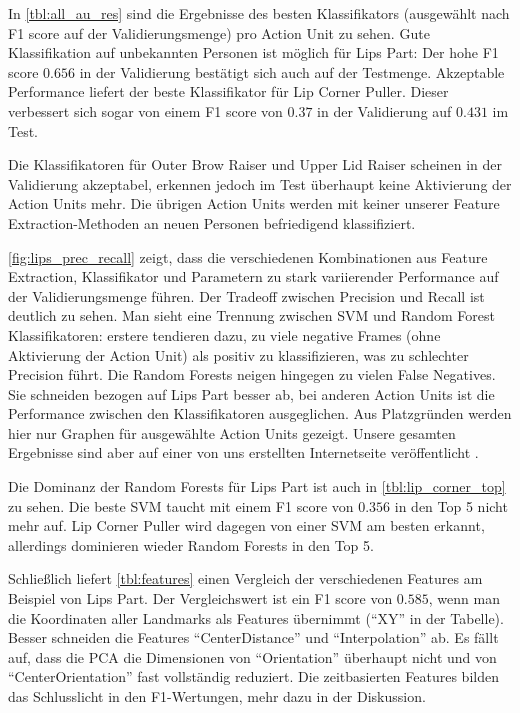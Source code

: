 In \cref{tbl:all_au_res} sind die Ergebnisse des besten Klassifikators
(ausgewählt nach F1 score auf der Validierungsmenge) pro Action Unit zu sehen.
Gute Klassifikation auf unbekannten Personen ist möglich für Lips Part: Der hohe
F1 score $0.656$ in der Validierung bestätigt sich auch auf der Testmenge. Akzeptable
Performance liefert der beste Klassifikator für Lip Corner Puller. Dieser
verbessert sich sogar von einem F1 score von $0.37$ in der Validierung auf
$0.431$ im Test.

Die Klassifikatoren für Outer Brow Raiser und Upper Lid Raiser scheinen in der
Validierung akzeptabel, erkennen jedoch im Test überhaupt keine Aktivierung der
Action Units mehr. Die übrigen Action Units werden mit keiner unserer Feature
Extraction-Methoden an neuen Personen befriedigend klassifiziert.

\cref{fig:lips_prec_recall} zeigt, dass die verschiedenen Kombinationen aus
Feature Extraction, Klassifikator und Parametern zu stark variierender
Performance auf der Validierungsmenge führen. Der Tradeoff zwischen Precision
und Recall ist deutlich zu sehen. Man sieht eine Trennung zwischen SVM und
Random Forest Klassifikatoren: erstere tendieren dazu, zu viele negative Frames
(ohne Aktivierung der Action Unit) als positiv zu klassifizieren, was zu
schlechter Precision führt. Die Random Forests neigen hingegen zu vielen False
Negatives. Sie schneiden bezogen auf Lips Part besser ab, bei anderen Action
Units ist die Performance zwischen den Klassifikatoren ausgeglichen.
Aus Platzgründen werden hier nur Graphen für ausgewählte Action Units gezeigt.
Unsere gesamten Ergebnisse sind aber auf einer von uns
erstellten Internetseite veröffentlicht
.



Die Dominanz der Random Forests für Lips Part ist auch in
\cref{tbl:lip_corner_top} zu sehen. Die beste SVM taucht mit einem F1 score von
$0.356$ in den Top 5 nicht mehr auf. Lip Corner Puller wird dagegen von einer
SVM am besten erkannt, allerdings dominieren wieder Random Forests in den Top 5.


Schließlich liefert \cref{tbl:features} einen Vergleich der verschiedenen
Features am Beispiel von Lips Part. Der Vergleichswert ist ein F1 score von
$0.585$, wenn man die Koordinaten aller Landmarks als Features übernimmt (``XY''
in der Tabelle). Besser schneiden die Features ``CenterDistance'' und
``Interpolation'' ab. Es fällt auf, dass die PCA die Dimensionen von
``Orientation'' überhaupt nicht und von ``CenterOrientation'' fast vollständig reduziert. Die zeitbasierten Features bilden das Schlusslicht in den
F1-Wertungen, mehr dazu in der Diskussion.

